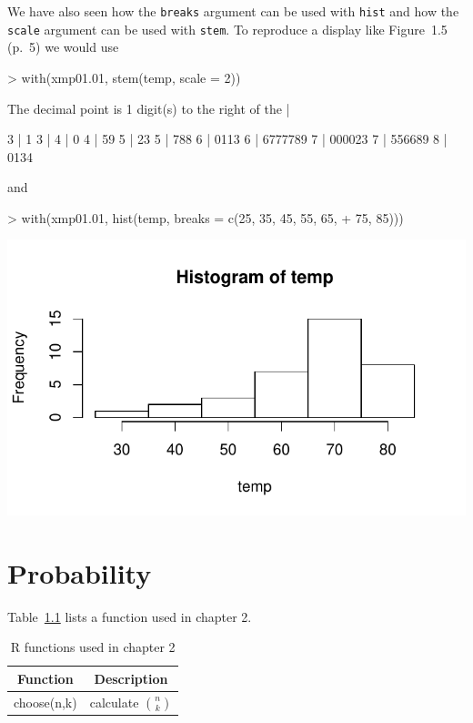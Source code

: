 \documentclass{book}
\begin{document}
We have also seen how the \texttt{breaks} argument can be used with
\texttt{hist} and how the \texttt{scale} argument can be used with
\texttt{stem}.  To reproduce a display like Figure~1.5 (p.~5) we would
use
\begin{Schunk}
\begin{Sinput}
> with(xmp01.01, stem(temp, scale = 2))
\end{Sinput}
\begin{Soutput}
  The decimal point is 1 digit(s) to the right of the |

  3 | 1
  3 | 
  4 | 0
  4 | 59
  5 | 23
  5 | 788
  6 | 0113
  6 | 6777789
  7 | 000023
  7 | 556689
  8 | 0134
\end{Soutput}
\end{Schunk}
and
\begin{Schunk}
\begin{Sinput}
> with(xmp01.01, hist(temp, breaks = c(25, 35, 45, 55, 65, 
+     75, 85)))
\end{Sinput}
\end{Schunk}
\includegraphics{Devore6-032}

\chapter{Probability}
\label{ch:Probability}

Table~\ref{tab:ch2} lists a function used in chapter 2.
\begin{table}[htbp]
  \centering
  \begin{tabular}{l l}
    \multicolumn{1}{c}{\textbf{Function}} &
    \multicolumn{1}{c}{\textbf{Description}} \\
    \hline
    choose(n,k)   & calculate $\binom{n}{k}$\\
    \hline
  \end{tabular}
  \caption{R functions used in chapter 2}
  \label{tab:ch2}
\end{table}
\end{document}
